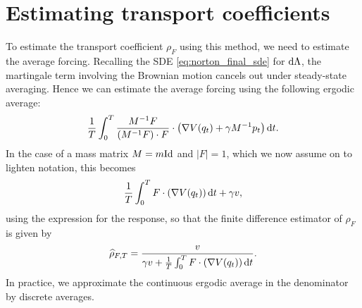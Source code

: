 \section{Estimating transport coefficients}
To estimate the transport coefficient $\rho_F$ using this method, we need to estimate the average forcing. Recalling the SDE \eqref{eq:norton_final_sde} for $\mathrm{d} \Lambda$, the martingale term involving the Brownian motion cancels out under steady-state averaging.
Hence we can estimate the average forcing using the following ergodic average:
\begin{equation}
    \label{eq:norton_ergodic_forcing}
    \frac{1}T\int_0^T\frac{M^{-1}F}{\left(M^{-1}F\right)\cdot F}\cdot\left(\nabla V(q_t)+\gamma M^{-1}p_t\right)\mathrm{d} t.
\end{equation}
In the case of a mass matrix $M=m\mathrm{Id}$ and $|F|=1$, which we now assume on to lighten notation, this becomes
\begin{equation}
    \label{eq:norton_ergodic_forcing_homogeneous}
    \frac{1}{T}\int_0^T F\cdot\left(\nabla V(q_t)\right)\mathrm{d} t + \gamma v,
\end{equation}
using the expression for the response, so that the finite difference estimator of $\rho_F$ is given by
\begin{equation}
    \label{eq:norton_transport estimator}
    \widehat{\rho}_{F,T}=\frac{v}{\gamma v+\frac{1}{T}\int_0^T F\cdot\left(\nabla V(q_t)\right)\mathrm{d} t}.
\end{equation}
In practice, we approximate the continuous ergodic average in the denominator by discrete averages.